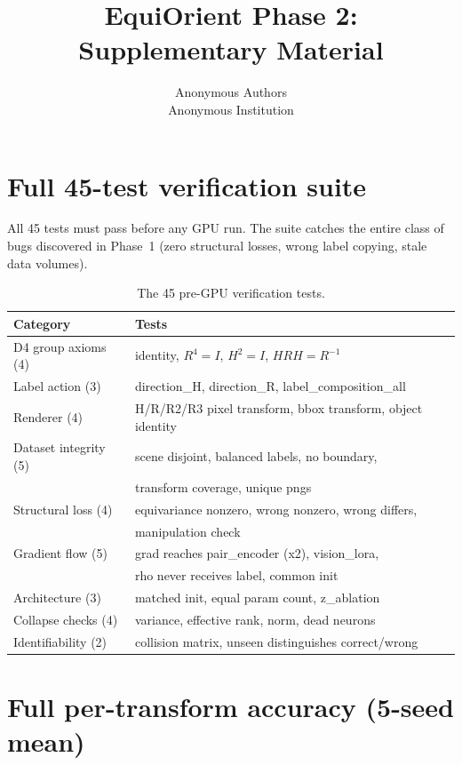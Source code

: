\documentclass[10pt,letterpaper]{article}
\title{EquiOrient Phase 2: Supplementary Material}
\author{Anonymous Authors\\
Anonymous Institution}
\begin{document}
\maketitle

\section{Full 45-test verification suite}

All 45 tests must pass before any GPU run. The suite catches the
entire class of bugs discovered in Phase~1 (zero structural losses,
wrong label copying, stale data volumes).

\begin{table}[h]
\centering\small
\begin{tabular}{ll}
\toprule
Category & Tests \\
\midrule
D4 group axioms (4) & identity, $R^4{=}I$, $H^2{=}I$, $HRH{=}R^{-1}$ \\
Label action (3) & direction\_H, direction\_R, label\_composition\_all \\
Renderer (4) & H/R/R2/R3 pixel transform, bbox transform, object identity \\
Dataset integrity (5) & scene disjoint, balanced labels, no boundary, \\
 & transform coverage, unique pngs \\
Structural loss (4) & equivariance nonzero, wrong nonzero, wrong differs, \\
 & manipulation check \\
Gradient flow (5) & grad reaches pair\_encoder (x2), vision\_lora, \\
 & rho never receives label, common init \\
Architecture (3) & matched init, equal param count, z\_ablation \\
Collapse checks (4) & variance, effective rank, norm, dead neurons \\
Identifiability (2) & collision matrix, unseen distinguishes correct/wrong \\
\bottomrule
\end{tabular}
\caption{The 45 pre-GPU verification tests.}
\end{table}

\section{Full per-transform accuracy (5-seed mean)}
\end{document}
